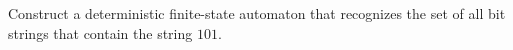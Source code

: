 \documentclass[../main.tex]{subfiles}
\begin{document}
Construct a deterministic finite-state automaton that recognizes the set of all bit strings that contain the string $101$.

\solution
\end{document}
